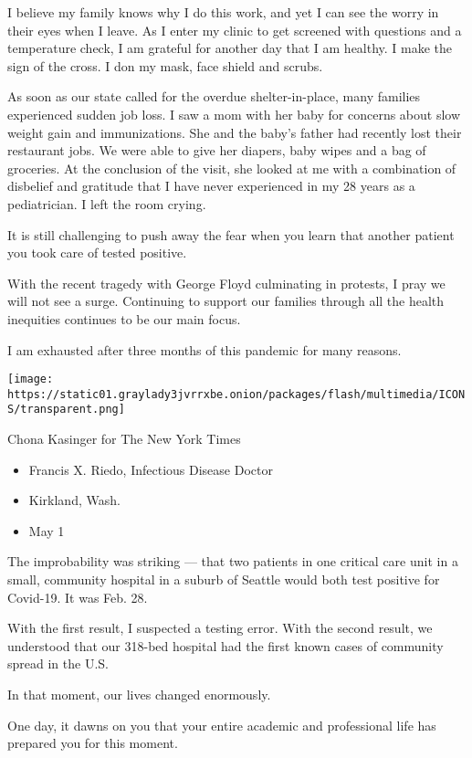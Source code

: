 I believe my family knows why I do this work, and yet I can see the
worry in their eyes when I leave. As I enter my clinic to get screened
with questions and a temperature check, I am grateful for another day
that I am healthy. I make the sign of the cross. I don my mask, face
shield and scrubs.

As soon as our state called for the overdue shelter-in-place, many
families experienced sudden job loss. I saw a mom with her baby for
concerns about slow weight gain and immunizations. She and the baby's
father had recently lost their restaurant jobs. We were able to give her
diapers, baby wipes and a bag of groceries. At the conclusion of the
visit, she looked at me with a combination of disbelief and gratitude
that I have never experienced in my 28 years as a pediatrician. I left
the room crying.

It is still challenging to push away the fear when you learn that
another patient you took care of tested positive.

With the recent tragedy with George Floyd culminating in protests, I
pray we will not see a surge. Continuing to support our families through
all the health inequities continues to be our main focus.

I am exhausted after three months of this pandemic for many reasons.

\texttt{[image: https://static01.graylady3jvrrxbe.onion/packages/flash/multimedia/ICONS/transparent.png]}

Chona Kasinger for The New York Times

\begin{itemize}
\tightlist
\item
  Francis X. Riedo, Infectious Disease Doctor
\item
  Kirkland, Wash.
\item
  May 1
\end{itemize}

The improbability was striking --- that two patients in one critical
care unit in a small, community hospital in a suburb of Seattle would
both test positive for Covid-19. It was Feb. 28.

With the first result, I suspected a testing error. With the second
result, we understood that our 318-bed hospital had the first known
cases of community spread in the U.S.

In that moment, our lives changed enormously.

One day, it dawns on you that your entire academic and professional life
has prepared you for this moment.


